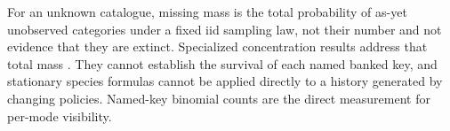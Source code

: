 For an unknown catalogue, missing mass is the total probability of as-yet
unobserved categories under a fixed iid sampling law, not their number and
not evidence that they are extinct. Specialized concentration results address
that total mass \cite{mcallester2003,berend2013}. They cannot establish the
survival of each named banked key, and stationary species formulas cannot be
applied directly to a history generated by changing policies. Named-key
binomial counts are the direct measurement for per-mode visibility.

